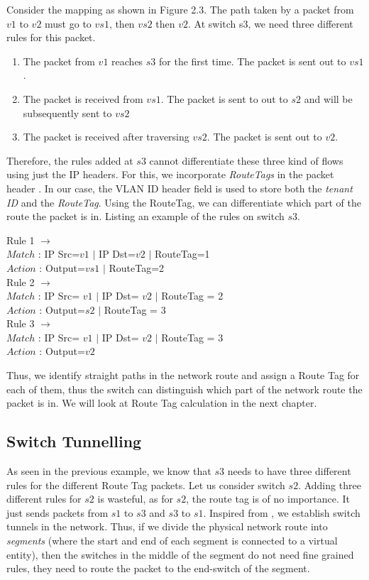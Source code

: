 Consider the mapping as shown in Figure 2.3. The path taken by a packet from $v1$ to $v2$ must go to $vs1$, then $vs2$ then $v2$. At switch s3, we need three different rules for this packet. 
\begin{enumerate}
	\item The packet from $v1$ reaches $s3$ for the first time. The packet is sent out to $vs1$. 
	\item The packet is received from $vs1$. The packet is sent to out to $s2$ and will be subsequently sent to $vs2$
	\item The packet is received after traversing $vs2$. The packet is sent out to $v2$.
\end{enumerate}
Therefore, the rules added at $s3$ cannot differentiate these three kind of flows using just the IP headers. For this, we incorporate \emph{RouteTags} in the packet header \cite{simple}. In our case, the VLAN ID header field is used to store both the \emph{tenant ID} and the \emph{RouteTag}. Using the RouteTag, we can differentiate which part of the route the packet is in. Listing an example of the rules on switch $s3$. 
\begin{center}
	Rule 1 $\rightarrow$ \\
	$Match$ : IP Src=$v1$ $|$ IP Dst=$v2$ $|$ RouteTag=1 \\
	$Action$ : Output=$vs1$ $|$ RouteTag=2 \\
	Rule 2 $\rightarrow$ \\
	$Match$ : IP Src= $v1$ $|$ IP Dst= $v2$ $|$ RouteTag = 2 \\
	$Action$ : Output=$s2$ $|$ RouteTag = 3 \\
	Rule 3 $\rightarrow$ \\
	$Match$ : IP Src= $v1$ $|$ IP Dst= $v2$ $|$ RouteTag = 3 \\
	$Action$ : Output=$v2$ 
\end{center}
Thus, we identify straight paths in the network route and assign a Route Tag for each of them, thus the switch can distinguish which
part of the network route the packet is in. We will look at Route Tag calculation in the next chapter.

\subsection {Switch Tunnelling} 
As seen in the previous example, we know that $s3$ needs to have three different rules for the different Route Tag 
packets. Let us consider switch $s2$. Adding three different rules for $s2$ is wasteful, as for $s2$, the route tag is 
of no importance. It just sends packets from $s1$ to $s3$ and $s3$ to $s1$. Inspired from \cite{simple}, we establish
switch tunnels in the network.  Thus, if we divide the physical network route into \emph{segments} (where the start and end of each segment is connected to a virtual entity), then the switches in the middle of the segment do not need fine grained rules, they need to route the packet to the end-switch of the segment. \\


